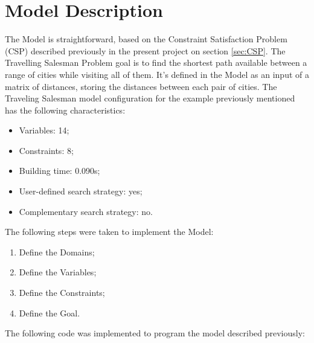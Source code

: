 \documentclass[runningheads,a4paper,english]{llncs}[2022/01/12]
\begin{document}
\section{Model Description}
\label{sec:ModelDescription}
The Model is straightforward, based on the Constraint Satisfaction Problem (CSP) described previously in the present project on section \ref{sec:CSP}. \newline\newline
The Travelling Salesman Problem goal is to find the shortest path available between a range of cities while visiting all of them.\newline
It’s defined in the Model as an input of a matrix of distances, storing the distances between each pair of cities. \newline\newline
The Traveling Salesman model configuration for the example previously mentioned has the following characteristics:
\begin{itemize}
  \item Variables: 14;
  \item Constraints: 8;
  \item Building time: 0.090s;
  \item User-defined search strategy: yes;
  \item Complementary search strategy: no.
\end{itemize}
The following steps were taken to implement the Model:
\begin{enumerate}
  \item Define the Domains;
  \item Define the Variables;
  \item Define the Constraints;
  \item Define the Goal.
\end{enumerate}
The following code was implemented to program the model described previously: \newline
\end{document}
